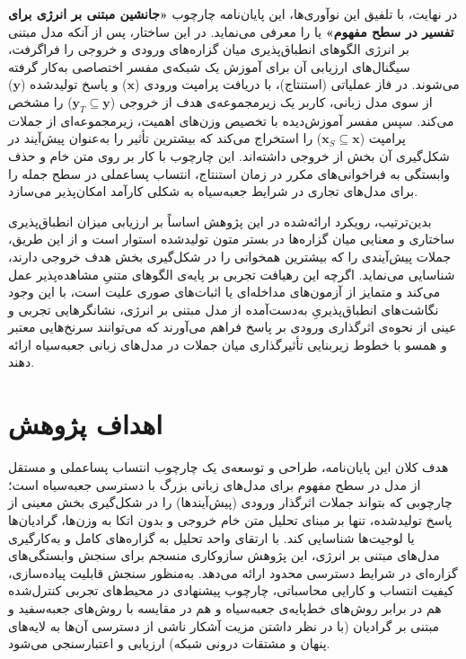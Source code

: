 در نهایت، با تلفیق این نوآوری‌ها، این پایان‌نامه چارچوب \textbf{«جانشین مبتنی بر انرژی برای تفسیر در سطح مفهوم»} یا  را معرفی می‌نماید. در این ساختار، پس از آنکه مدل مبتنی بر انرژی الگوهای انطباق‌پذیری میان گزاره‌های ورودی و خروجی را فراگرفت، سیگنال‌های ارزیابی آن برای آموزش یک شبکه‌ی مفسر اختصاصی به‌کار گرفته می‌شوند. در فاز عملیاتی (استنتاج)، با دریافت پرامپت ورودی ($\mathbf{x}$) و پاسخ تولیدشده ($\mathbf{y}$) از سوی مدل زبانی، کاربر یک زیرمجموعه‌ی هدف از خروجی ($\mathbf{y}_T \subseteq \mathbf{y}$) را مشخص می‌کند. سپس مفسر آموزش‌دیده با تخصیص وزن‌های اهمیت، زیرمجموعه‌ای از جملات پرامپت ($\mathbf{x}_S \subseteq \mathbf{x}$) را استخراج می‌کند که بیشترین تأثیر را به‌عنوان پیش‌آیند در شکل‌گیری آن بخش از خروجی داشته‌اند. این چارچوب با کار بر روی متن خام و حذف وابستگی به فراخوانی‌های مکرر  در زمان استنتاج، انتساب پساعملی در سطح جمله را برای مدل‌های تجاری در شرایط جعبه‌سیاه به شکلی کارآمد امکان‌پذیر می‌سازد.

بدین‌ترتیب، رویکرد ارائه‌شده در این پژوهش اساساً بر ارزیابی میزان انطباق‌پذیری ساختاری و معنایی میان گزاره‌ها در بستر متون تولیدشده استوار است و از این طریق، جملات پیش‌آیندی را که بیشترین همخوانی را در شکل‌گیری بخش هدف خروجی دارند، شناسایی می‌نماید. اگرچه این رهیافت تجربی بر پایه‌ی الگوهای متنیِ مشاهده‌پذیر عمل می‌کند و متمایز از آزمون‌های مداخله‌ای یا اثبات‌های صوری علیت است، با این وجود نگاشت‌های انطباق‌پذیریِ به‌دست‌آمده از مدل مبتنی بر انرژی، نشانگرهایی تجربی و عینی از نحوه‌ی اثرگذاری ورودی بر پاسخ فراهم می‌آورند که می‌توانند سرنخ‌هایی معتبر و همسو با خطوط زیربنایی تأثیرگذاری میان جملات در مدل‌های زبانی جعبه‌سیاه ارائه دهند.


\section{اهداف پژوهش}\label{sec:1-5}

هدف کلان این پایان‌نامه، طراحی و توسعه‌ی یک چارچوب انتساب پساعملی و مستقل از مدل در سطح مفهوم برای مدل‌های زبانی بزرگ با دسترسی جعبه‌سیاه است؛ چارچوبی که بتواند جملات اثرگذار ورودی (پیش‌آیندها) را در شکل‌گیری بخش معینی از پاسخ تولیدشده، تنها بر مبنای تحلیل متن خام خروجی و بدون اتکا به وزن‌ها، گرادیان‌ها یا لوجیت‌ها شناسایی کند. با ارتقای واحد تحلیل به گزاره‌های کامل و به‌کارگیری مدل‌های مبتنی بر انرژی، این پژوهش سازوکاری منسجم برای سنجش وابستگی‌های گزاره‌ای در شرایط دسترسی محدود ارائه می‌دهد. به‌منظور سنجش قابلیت پیاده‌سازی، کیفیت انتساب و کارایی محاسباتی، چارچوب پیشنهادی در محیط‌های تجربی کنترل‌شده هم در برابر روش‌های خط‌پایه‌ی جعبه‌سیاه و هم در مقایسه با روش‌های جعبه‌سفید و مبتنی بر گرادیان (با در نظر داشتن مزیت آشکار ناشی از دسترسی آن‌ها به لایه‌های پنهان و مشتقات درونی شبکه) ارزیابی و اعتبارسنجی می‌شود.

